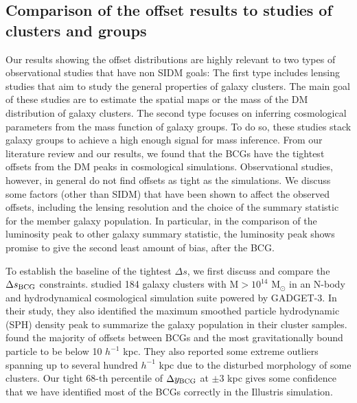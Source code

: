 \subsection{Comparison of the offset results to studies of clusters and groups}
\label{subsec:non_SIDM_offsets}
Our results showing the offset distributions are highly relevant to two types of
observational studies that have non SIDM goals: 
The first type includes lensing studies that aim to study the general properties of 
galaxy clusters. The main goal of these studies are to estimate the spatial maps or 
the mass of the DM distribution of galaxy clusters. 
The second type focuses on inferring cosmological parameters from the 
mass function of galaxy groups. To do so, these studies stack galaxy 
groups to achieve a high enough signal for mass inference.
From our literature review and our results, we found that
the BCGs have the tightest offsets from the DM peaks in cosmological simulations. 
Observational studies, however, in general do not find offsets as tight as the 
simulations. We discuss some factors (other than SIDM) that 
have been shown to affect the observed offsets, including the lensing resolution and the
choice of the summary statistic for the member galaxy population. In particular, 
in the comparison of the luminosity peak to other galaxy summary statistic,
the luminosity peak shows promise to give the second least amount of bias,
after the BCG. 
 
To establish the baseline of the tightest $\Delta s$, we first discuss and 
compare the $\Delta s_{\rm BCG}$ constraints.   
\cite{Cui2015} studied 184 galaxy clusters with M$ > 10^{14}$ M$_\odot$ in an
N-body and hydrodynamical cosmological simulation suite powered by GADGET-3. 
In their study, they also identified the maximum smoothed particle hydrodynamic (SPH) density peak
to summarize 
the galaxy population in their cluster samples. \cite{Cui2015} found
the majority of offsets between BCGs and the most gravitationally bound particle to be
below 10 $h^{-1}$ kpc. They also reported some extreme outliers 
spanning up to several hundred $h^{-1}$ kpc due to the disturbed morphology of
some clusters. Our 
tight 68-th percentile of 
$\Delta y_{\rm BCG}$ at $ \pm 3$ kpc gives some confidence that 
we have identified most of the BCGs correctly in the Illustris simulation.

